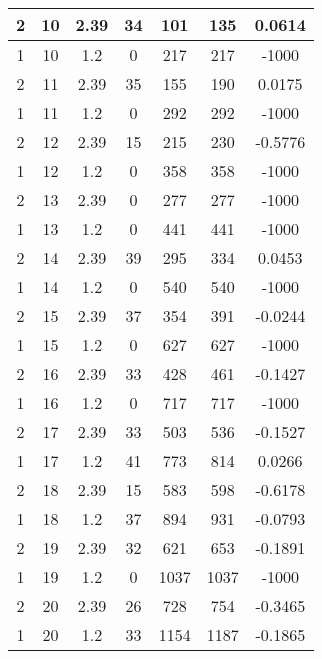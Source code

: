 \documentclass[letterpaper, 12pt]{article}
\begin{document}
\begin{longtable}{|c|c|c|c|c|c|c|}
\hline
2 & 10 & 2.39 & 34 & 101 & 135 & 0.0614 \\
\hline
1 & 10 & 1.2 & 0 & 217 & 217 & -1000 \\
\hline
2 & 11 & 2.39 & 35 & 155 & 190 & 0.0175 \\
\hline
1 & 11 & 1.2 & 0 & 292 & 292 & -1000 \\
\hline
2 & 12 & 2.39 & 15 & 215 & 230 & -0.5776 \\
\hline
1 & 12 & 1.2 & 0 & 358 & 358 & -1000 \\
\hline
2 & 13 & 2.39 & 0 & 277 & 277 & -1000 \\
\hline
1 & 13 & 1.2 & 0 & 441 & 441 & -1000 \\
\hline
2 & 14 & 2.39 & 39 & 295 & 334 & 0.0453 \\
\hline
1 & 14 & 1.2 & 0 & 540 & 540 & -1000 \\
\hline
2 & 15 & 2.39 & 37 & 354 & 391 & -0.0244 \\
\hline
1 & 15 & 1.2 & 0 & 627 & 627 & -1000 \\
\hline
2 & 16 & 2.39 & 33 & 428 & 461 & -0.1427 \\
\hline
1 & 16 & 1.2 & 0 & 717 & 717 & -1000 \\
\hline
2 & 17 & 2.39 & 33 & 503 & 536 & -0.1527 \\
\hline
1 & 17 & 1.2 & 41 & 773 & 814 & 0.0266 \\
\hline
2 & 18 & 2.39 & 15 & 583 & 598 & -0.6178 \\
\hline
1 & 18 & 1.2 & 37 & 894 & 931 & -0.0793 \\
\hline
2 & 19 & 2.39 & 32 & 621 & 653 & -0.1891 \\
\hline
1 & 19 & 1.2 & 0 & 1037 & 1037 & -1000 \\
\hline
2 & 20 & 2.39 & 26 & 728 & 754 & -0.3465 \\
\hline
1 & 20 & 1.2 & 33 & 1154 & 1187 & -0.1865 \\
\hline
\end{longtable}
\end{document}

